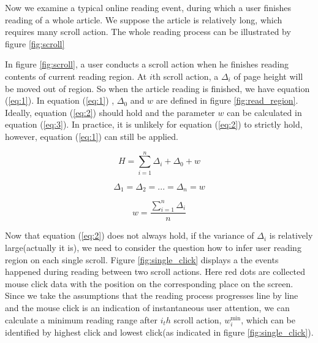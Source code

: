 \documentclass{sigchi}
\begin{document}
Now we examine a typical online reading event, during which a user finishes reading of a whole article. We suppose 
 the article is relatively long, which requires many scroll action. The whole reading process can be illustrated by figure \ref{fig:scroll}


In figure \ref{fig:scroll}, a user conducts a scroll action when he finishes reading contents of current reading region. 
At $i$th scroll action, a $\Delta_i$ of page height will be moved out of region. So when the article reading is finished, 
we have equation (\ref{eq:1}). In equation (\ref{eq:1}) , $\Delta_0$ and $w$ are defined in figure 
\ref{fig:read_region}. Ideally, equation (\ref{eq:2}) should hold and the parameter $w$ can be 
calculated in equation (\ref{eq:3}). In practice, it is unlikely for equation (\ref{eq:2}) to strictly hold,
however, equation (\ref{eq:1}) can still be applied. 

\begin{equation} \label{eq:1}
	H = \sum\limits_{i = 1}^n {{\Delta _i} + {\Delta _0} + w} 
\end{equation}

\begin{equation} \label{eq:2}
	{\Delta _1} = {\Delta _2} = ... = {\Delta _n} = w
\end{equation}

\begin{equation} \label{eq:3}
	w = \frac{{\sum\limits_{i = 1}^n {{\Delta _i}} }}{n}
\end{equation}


Now that equation (\ref{eq:2}) does not always hold, if the variance of $\Delta_i$ is relatively large(actually it is),
we need to consider the question how to infer user reading  region on each single scroll. Figure \ref{fig:single_click}
displays a the events happened during  reading between two scroll actions. Here red dots are collected mouse click data with
the position on the corresponding place on the screen. Since we take the assumptions that the reading process progresses 
line by line and the mouse click is an indication of instantaneous user attention, we can calculate a minimum reading range after $i_th$ scroll action, 
$w_i^{\min }$, which can be identified by highest click and lowest click(as indicated in figure  \ref{fig:single_click}). 
\end{document}
